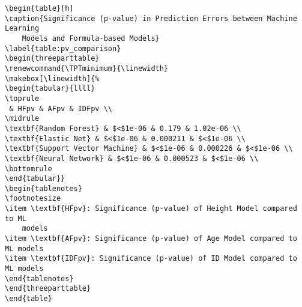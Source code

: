 \documentclass[11pt]{article}
\begin{document}
\begin{Verbatim}[tabsize=4]
\begin{table}[h]
\caption{Significance (p-value) in Prediction Errors between Machine Learning
	Models and Formula-based Models}
\label{table:pv_comparison}
\begin{threeparttable}
\renewcommand{\TPTminimum}{\linewidth}
\makebox[\linewidth]{%
\begin{tabular}{llll}
\toprule
 & HFpv & AFpv & IDFpv \\
\midrule
\textbf{Random Forest} & $<$1e-06 & 0.179 & 1.02e-06 \\
\textbf{Elastic Net} & $<$1e-06 & 0.000211 & $<$1e-06 \\
\textbf{Support Vector Machine} & $<$1e-06 & 0.000226 & $<$1e-06 \\
\textbf{Neural Network} & $<$1e-06 & 0.000523 & $<$1e-06 \\
\bottomrule
\end{tabular}}
\begin{tablenotes}
\footnotesize
\item \textbf{HFpv}: Significance (p-value) of Height Model compared to ML
	models
\item \textbf{AFpv}: Significance (p-value) of Age Model compared to ML models
\item \textbf{IDFpv}: Significance (p-value) of ID Model compared to ML models
\end{tablenotes}
\end{threeparttable}
\end{table}

\end{Verbatim}
\end{document}
